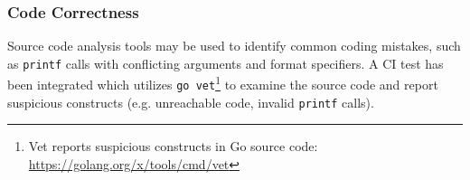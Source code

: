 
\subsubsection{Code Correctness}

Source code analysis tools may be used to identify common coding mistakes, such as \texttt{printf} calls with conflicting arguments and format specifiers. A CI test has been integrated which utilizes \texttt{go vet}\footnote{Vet reports suspicious constructs in Go source code: \url{https://golang.org/x/tools/cmd/vet}} to examine the source code and report suspicious constructs (e.g. unreachable code, invalid \texttt{printf} calls).

